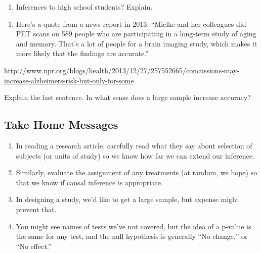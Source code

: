 \documentclass[
]{report}
\providecommand{\tightlist}{%
  \setlength{\itemsep}{0pt}\setlength{\parskip}{0pt}}
\begin{document}
\vspace{0.5in}

\begin{enumerate}
\def\labelenumi{\alph{enumi})}
\setcounter{enumi}{3}
\tightlist
\item
  Inferences to high school students? Explain.
\end{enumerate}

\vspace{0.5in}

\begin{enumerate}
\def\labelenumi{\arabic{enumi}.}
\setcounter{enumi}{4}
\tightlist
\item
  Here's a quote from a news report in 2013:
  ``Mielke and her colleagues did PET scans on 589 people who are participating in a long-term study of aging and memory. That's a lot of people for a brain imaging study, which makes it more likely that the findings are accurate.''
\end{enumerate}

\url{http://www.npr.org/blogs/health/2013/12/27/257552665/concussions-may-increase-alzheimers-risk-but-only-for-some}

Explain the last sentence. In what sense does a large sample increase accuracy?

\vspace{1in}

\hypertarget{take-home-messages-24}{%
\subsection{Take Home Messages}\label{take-home-messages-24}}

\begin{enumerate}
\def\labelenumi{\arabic{enumi}.}
\item
  In reading a research article, carefully read what they say about selection of subjects (or units of study) so we know how far we can extend our inference.
\item
  Similarly, evaluate the assignment of any treatments (at random, we hope) so that we know if causal inference is appropriate.
\item
  In designing a study, we'd like to get a large sample, but expense might prevent that.
\item
  You might see names of tests we've not covered, but the idea of a p-value is the same for any test, and the null hypothesis is generally ``No change,'' or ``No effect.''
\end{enumerate}
\end{document}
